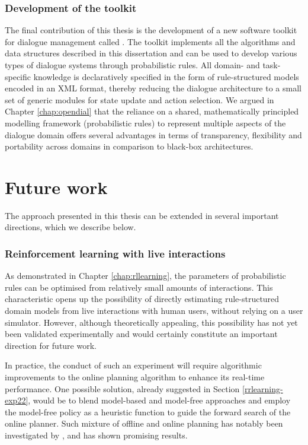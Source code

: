 

\subsubsection*{Development of the \opendial{} toolkit}

The final contribution of this thesis is the development of a new software toolkit for dialogue management called \opendial{}. The toolkit implements all the algorithms and data structures described in this dissertation and can be used to develop various types of dialogue systems through probabilistic rules. All domain- and task-specific knowledge is declaratively specified in the form of rule-structured models encoded in an XML format, thereby reducing the dialogue architecture to a small set of generic modules for state update and action selection.  We argued in Chapter \ref{chap:opendial} that the reliance on a shared, mathematically principled modelling framework (probabilistic rules) to represent multiple aspects of the dialogue domain offers several advantages in terms of transparency, flexibility and portability across domains in comparison to black-box architectures.

\section{Future work}

The approach presented in this thesis can be extended in several important directions, which we describe below. 

\subsubsection*{Reinforcement learning with live interactions}

As demonstrated in Chapter \ref{chap:rllearning}, the parameters of probabilistic rules can be optimised from relatively small amounts of interactions.  This characteristic opens up the possibility of directly estimating rule-structured domain models from live interactions with human users, without relying on a user simulator.  However, although theoretically appealing, this possibility has not yet been validated experimentally and would certainly constitute an important direction for future work.

In practice, the conduct of such an experiment will require algorithmic improvements to the online planning algorithm to enhance its real-time performance. One possible solution, already suggested in Section \ref{rrlearning-exp22}, would be to blend model-based and model-free approaches and employ the model-free policy as a heuristic function to guide the forward search of the online planner.  Such mixture of offline and online planning has notably been investigated by \cite{RossC07}, and has shown promising results.


